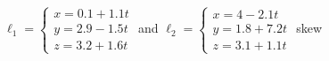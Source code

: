 {$\ell_1 = \begin{cases}x=0.1+1.1t\\y=2.9-1.5t\\z=3.2+1.6t\end{cases}$ \quad and \quad
$\ell_2 = \begin{cases}x=4-2.1t\\y=1.8+7.2t\\z=3.1+1.1t\end{cases}$
}
{skew
}

